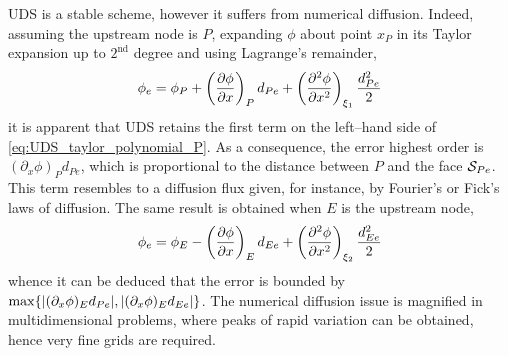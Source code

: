 UDS is a stable scheme, however it suffers from numerical diffusion. Indeed,
assuming the upstream node is $P$, expanding $\phi$ about point $x_P$ in its
Taylor expansion up to $2^\text{nd}$ degree and using Lagrange's remainder,
\begin{equation} \label{eq:UDS_taylor_polynomial_P}
	\phi_e = 
	\phi_P + \left(\pdv{\phi}{x}\right)_P d_{Pe} + 
	\left(\pdv[2]{\phi}{x}\right)_{\xi_1} \frac{d_{Pe}^2}{2}
\end{equation}
it is apparent that UDS retains the first term on the left--hand side of
\eqref{eq:UDS_taylor_polynomial_P}. As a consequence, the error highest order is
$(\partial_x \phi)_P d_{Pe}$, which is proportional to the distance between $P$
and the face $\mathcal{S}_{Pe}$. This term resembles to a diffusion flux given, for
instance, by Fourier's or Fick's laws of diffusion. The same result is obtained
when $E$ is the upstream node,
\begin{equation}
	\phi_e = 
	\phi_E - \left(\pdv{\phi}{x}\right)_E d_{Ee} + \left(\pdv[2]{\phi}{x}\right)_{\xi_2} \frac{d_{Ee}^2}{2}
\end{equation}
whence it can be deduced that the error is bounded by $\max\{ \abs{(\partial_x
\phi)_E d_{Pe}}, \abs{(\partial_x \phi)_E d_{Ee}}\}$. The numerical diffusion
issue is magnified in multidimensional problems, where peaks of rapid variation
can be obtained, hence very fine grids are required. 